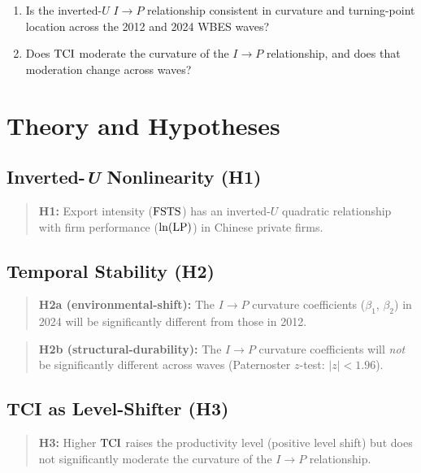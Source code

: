 \documentclass[12pt,a4paper]{article}
\begin{document}
\begin{enumerate}
  \item Is the inverted-\(U\) \(I \to P\) relationship consistent in curvature
    and turning-point location across the 2012 and 2024 WBES waves?
  \item Does \({\mathrm{TCI}}\) moderate the curvature of the \(I \to P\) relationship,
    and does that moderation change across waves?
\end{enumerate}

\section{Theory and Hypotheses}
\label{sec:theory}

\subsection{Inverted-\textit{U} Nonlinearity (H1)}

\begin{quote}
\textbf{H1:} Export intensity (\({\mathrm{FSTS}}\)) has an inverted-\(U\) quadratic
relationship with firm performance (\({\ln(\mathrm{LP})}\)) in Chinese private firms.
\end{quote}

\subsection{Temporal Stability (H2)}

\begin{quote}
\textbf{H2a (environmental-shift):} The \(I \to P\) curvature coefficients
(\(\beta_1\), \(\beta_2\)) in 2024 will be significantly different from those
in 2012.
\end{quote}

\begin{quote}
\textbf{H2b (structural-durability):} The \(I \to P\) curvature coefficients
will \emph{not} be significantly different across waves (Paternoster
\(z\)-test: \(|z| < 1.96\)).
\end{quote}

\subsection{TCI as Level-Shifter (H3)}

\begin{quote}
\textbf{H3:} Higher \({\mathrm{TCI}}\) raises the productivity level (positive level
shift) but does not significantly moderate the curvature of the \(I \to P\)
relationship.
\end{quote}
\end{document}
